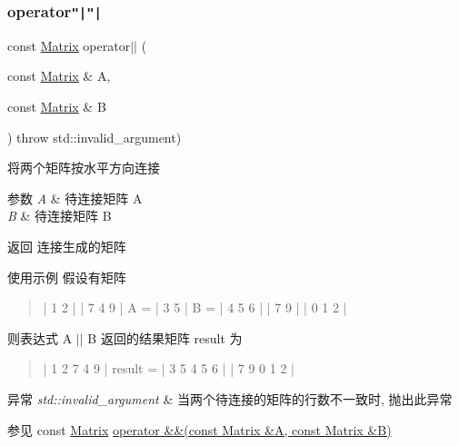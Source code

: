 \subsubsection{\texorpdfstring{operator\texttt{"|}\texttt{"|}}{operator||}}
{\footnotesize\ttfamily const \hyperlink{classkerbal_1_1math_1_1_matrix}{Matrix} operator$\vert$$\vert$ (\begin{DoxyParamCaption}\item[{const \hyperlink{classkerbal_1_1math_1_1_matrix}{Matrix} \&}]{A,  }\item[{const \hyperlink{classkerbal_1_1math_1_1_matrix}{Matrix} \&}]{B }\end{DoxyParamCaption}) throw  std\+::invalid\+\_\+argument) \hspace{0.3cm}{\ttfamily [friend]}}



将两个矩阵按水平方向连接 


\begin{DoxyParams}{参数}
{\em A} & 待连接矩阵 A \\
\hline
{\em B} & 待连接矩阵 B \\
\hline
\end{DoxyParams}
\begin{DoxyReturn}{返回}
连接生成的矩阵 
\end{DoxyReturn}
\begin{DoxyParagraph}{使用示例}
假设有矩阵~\newline
\begin{quote}
\begin{DoxyVerb}    | 1 2 |         | 7 4 9 |
A = | 3 5 |     B = | 4 5 6 |
    | 7 9 |         | 0 1 2 |
\end{DoxyVerb}


\end{quote}
则表达式 A $\vert$$\vert$ B 返回的结果矩阵 result 为~\newline
\begin{quote}
\begin{DoxyVerb}         | 1 2 7 4 9 |
result = | 3 5 4 5 6 |
         | 7 9 0 1 2 |
\end{DoxyVerb}


\end{quote}

\end{DoxyParagraph}

\begin{DoxyExceptions}{异常}
{\em std\+::invalid\+\_\+argument} & 当两个待连接的矩阵的行数不一致时, 抛出此异常 \\
\hline
\end{DoxyExceptions}
\begin{DoxySeeAlso}{参见}
const \hyperlink{classkerbal_1_1math_1_1_matrix}{Matrix} \hyperlink{classkerbal_1_1math_1_1_matrix_a8b58a45223c7264d0e45d238f66b1eb5}{operator \&\&(const Matrix \&\+A, const Matrix \&\+B)} 
\end{DoxySeeAlso}
\mbox{\label{classkerbal_1_1math_1_1_matrix_a35bd334cc41142e574a3261853fd14d2}} 
